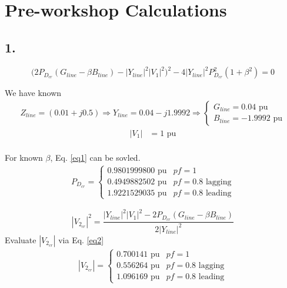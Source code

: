 \documentclass{article}
\begin{document}
\section*{Pre-workshop Calculations}

\subsection*{1.}
\begin{equation}\label{eq1}
\Big( 2 P_{D_{cr}} (G_{line} - \beta B_{line}) - |Y_{line}|^2 |V_1|^2 \Big)^2 - 4 |Y_{line}|^2 P_{D_{cr}}^2 (1 + \beta^2) = 0
\end{equation}

We have known
\begin{align*}
Z_{line} = (0.01 + j0.5)
\Longrightarrow Y_{line} = 0.04 - j1.9992
\Longrightarrow
\begin{cases}
G_{line} = 0.04 \text{ pu}\\
B_{line} = -1.9992 \text{ pu}
\end{cases}
\end{align*}
\begin{align*}
|V_1| &= 1 \text{ pu}\\
\end{align*}

For known $\beta$, Eq. \ref{eq1} can be sovled.
\begin{align*}
P_{D_{cr}} =
\begin{cases}
0.9801999800 \text{ pu} &pf = 1\\
0.4949882502 \text{ pu} &pf = 0.8 \text{ lagging}\\
1.9221529035 \text{ pu} &pf = 0.8 \text{ leading}
\end{cases}
\end{align*}

\begin{equation}\label{eq2}
|V_{2_{cr}}|^2 = \frac{|Y_{line}|^2 |V_1|^2 - 2 P_{D_{cr}} (G_{line} - \beta B_{line})}{2 |Y_{line}|^2}
\end{equation}
Evaluate $|V_{2_{cr}}|$ via Eq. \ref{eq2}
\begin{align*}
|V_{2_{cr}}| =
\begin{cases}
0.700141 \text{ pu} &pf = 1\\
0.556264 \text{ pu} &pf = 0.8 \text{ lagging}\\
1.096169 \text{ pu} &pf = 0.8 \text{ leading}
\end{cases}
\end{align*}
\end{document}
